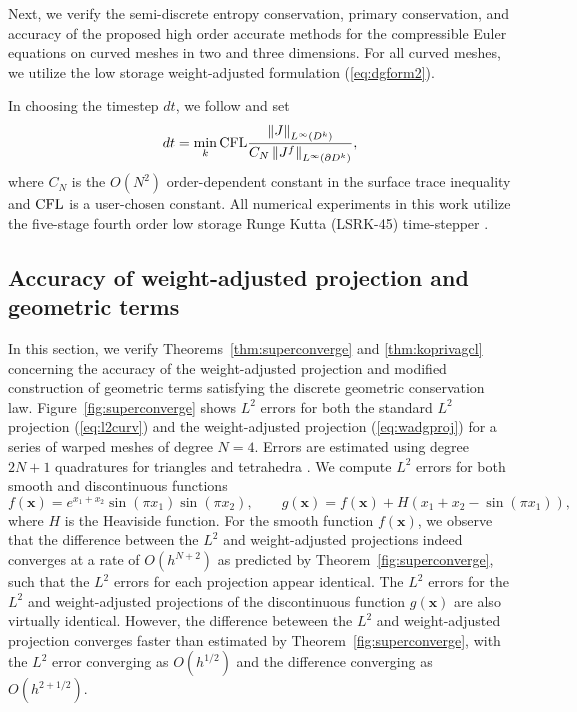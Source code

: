 \documentclass[10pt]{amsart}
\theoremstyle{definition}
\theoremstyle{lemma}
\theoremstyle{theorem}
\theoremstyle{assumption}
\newcommand{\nor}[1]{\left\| #1 \right\|}
\newcommand{\LRp}[1]{\left( #1 \right)}
\begin{document}
{Next, we verify the semi-discrete entropy conservation, primary conservation, and accuracy of the proposed high order accurate methods for the compressible Euler equations on curved meshes in two and three dimensions.  For all curved meshes, we utilize the low storage weight-adjusted formulation (\ref{eq:dgform2}).  

In choosing the timestep $dt$, we follow \cite{chan2015gpu} and set 
\begin{equation}
dt = \min_{k} {\rm CFL} \frac{\nor{J}_{L^{\infty}\LRp{D^k}}}{C_N\nor{J^f}_{L^{\infty}\LRp{\partial D^k}}},
\end{equation}
where $C_N$ is the $O(N^2)$ order-dependent constant in the surface trace inequality \cite{chan2015gpu} and ${\rm CFL}$ is a user-chosen constant.  All numerical experiments in this work utilize the five-stage fourth order low storage Runge Kutta (LSRK-45) time-stepper \cite{carpenter1994fourth}.  


\subsection{Accuracy of weight-adjusted projection and geometric terms}

In this section, we verify Theorems~\ref{thm:superconverge} and \ref{thm:koprivagcl} concerning the accuracy of the weight-adjusted projection and modified construction of geometric terms satisfying the discrete geometric conservation law.  Figure~\ref{fig:superconverge} shows $L^2$ errors for both the standard $L^2$ projection (\ref{eq:l2curv}) and the weight-adjusted projection (\ref{eq:wadgproj}) for a series of warped meshes of degree $N = 4$.  Errors are estimated using degree $2N+1$ quadratures for triangles and tetrahedra \cite{xiao2010quadrature}.  We compute $L^2$ errors for both smooth and discontinuous functions
\[
f(\bm{x}) = e^{x_1+x_2}\sin\LRp{{\pi x_1}}\sin\LRp{{\pi x_2}}, \qquad g(\bm{x}) = f(\bm{x}) + H(x_1+x_2-\sin(\pi x_1)),
\]
where $H$ is the Heaviside function.  For the smooth function $f(\bm{x})$, we observe that the difference between the $L^2$ and weight-adjusted projections indeed converges at a rate of $O\LRp{h^{N+2}}$ as predicted by Theorem~\ref{fig:superconverge}, such that the $L^2$ errors for each projection appear identical.  The $L^2$ errors for the $L^2$ and weight-adjusted projections of the discontinuous function $g(\bm{x})$ are also virtually identical.  However, the difference beteween the $L^2$ and weight-adjusted projection converges faster than estimated by Theorem~\ref{fig:superconverge}, with the $L^2$ error converging as $O(h^{1/2})$ and the difference converging as $O(h^{2+1/2})$. 

}
\end{document}
